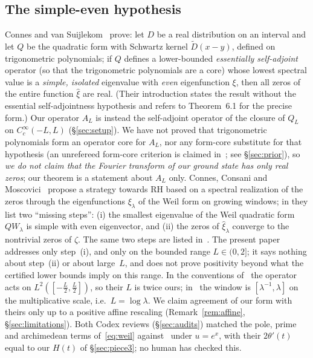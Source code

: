 \documentclass[11pt]{amsart}
\newcommand{\Lmax}{2}                                     %
\theoremstyle{definition}
\theoremstyle{remark}
\numberwithin{equation}{section}
\begin{document}
\subsection{The simple-even hypothesis}
Connes and van Suijlekom~\cite[Thm.~6.1]{CvS} prove: let $D$ be a real distribution on an interval and let $Q$ be the quadratic form with Schwartz kernel $\tilde D(x-y)$, defined on trigonometric polynomials; if $Q$ defines a lower-bounded \emph{essentially self-adjoint} operator (so that the trigonometric polynomials are a core) whose lowest spectral value is a \emph{simple, isolated} eigenvalue with \emph{even} eigenfunction $\xi$, then all zeros of the entire function $\hat\xi$ are real. (Their introduction states the result without the essential self-adjointness hypothesis and refers to Theorem~6.1 for the precise form.) Our operator $A_L$ is instead the self-adjoint operator of the closure of $Q_L$ on $C_c^\infty(-L,L)$ (\S\ref{sec:setup}). We have not proved that trigonometric polynomials form an operator core for $A_L$, nor any form-core substitute for that hypothesis (an unrefereed form-core criterion is claimed in~\cite{KB}; see \S\ref{sec:prior}), so \emph{we do not claim that the Fourier transform of our ground state has only real zeros}; our theorem is a statement about $A_L$ only. Connes, Consani and Moscovici~\cite{CCM25} propose a strategy towards RH based on a spectral realization of the zeros through the eigenfunctions $\xi_\lambda$ of the Weil form on growing windows; in \cite[\S8]{CCM25} they list two ``missing steps'': (i) the smallest eigenvalue of the Weil quadratic form $QW_\lambda$ is simple with even eigenvector, and (ii) the zeros of $\hat\xi_\lambda$ converge to the nontrivial zeros of $\zeta$. The same two steps are listed in~\cite[\S6.6]{Connes26}. The present paper addresses only step~(i), and only on the bounded range $L\in(0,\Lmax]$; it says nothing about step~(ii) or about large~$L$, and does not prove positivity beyond what the certified lower bounds imply on this range. In the conventions of~\cite{CvS} the operator acts on $L^2([-\tfrac L2,\tfrac L2])$, so their $L$ is twice ours; in~\cite{CCM25} the window is $[\lambda^{-1},\lambda]$ on the multiplicative scale, i.e.\ $L=\log\lambda$. We claim agreement of our form with theirs only up to a positive affine rescaling (Remark~\ref{rem:affine}, \S\ref{sec:limitations}). Both Codex reviews (\S\ref{sec:audits}) matched the pole, prime and archimedean terms of~\eqref{eq:weil} against~\cite[(3.7)--(3.11)]{CCM25} under $u=e^x$, with their $2\theta'(t)$ equal to our $H(t)$ of \S\ref{sec:piece3}; no human has checked this.
\end{document}
